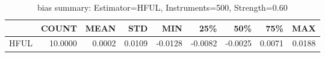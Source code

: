 \begin{table}[ht]
\centering
\caption{bias summary: Estimator=HFUL, Instruments=500, Strength=0.60}
\begin{tabular}{lrrrrrrrr}
\toprule
 & COUNT & MEAN & STD & MIN & 25\% & 50\% & 75\% & MAX \\
\midrule
HFUL & 10.0000 & 0.0002 & 0.0109 & -0.0128 & -0.0082 & -0.0025 & 0.0071 & 0.0188 \\
\bottomrule
\end{tabular}
\end{table}
